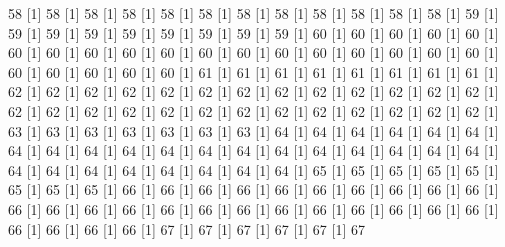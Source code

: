 \documentclass[12pt]{article}
\begin{document}
\begin{Schunk}
\begin{Soutput}
[1] 58%
[1] 58%
[1] 58%
[1] 58%
[1] 58%
[1] 58%
[1] 58%
[1] 58%
[1] 58%
[1] 58%
[1] 58%
[1] 58%
[1] 59%
[1] 59%
[1] 59%
[1] 59%
[1] 59%
[1] 59%
[1] 59%
[1] 59%
[1] 59%
[1] 60%
[1] 60%
[1] 60%
[1] 60%
[1] 60%
[1] 60%
[1] 60%
[1] 60%
[1] 60%
[1] 60%
[1] 60%
[1] 60%
[1] 60%
[1] 60%
[1] 60%
[1] 60%
[1] 60%
[1] 60%
[1] 60%
[1] 60%
[1] 60%
[1] 60%
[1] 60%
[1] 61%
[1] 61%
[1] 61%
[1] 61%
[1] 61%
[1] 61%
[1] 61%
[1] 61%
[1] 62%
[1] 62%
[1] 62%
[1] 62%
[1] 62%
[1] 62%
[1] 62%
[1] 62%
[1] 62%
[1] 62%
[1] 62%
[1] 62%
[1] 62%
[1] 62%
[1] 62%
[1] 62%
[1] 62%
[1] 62%
[1] 62%
[1] 62%
[1] 62%
[1] 62%
[1] 62%
[1] 62%
[1] 62%
[1] 62%
[1] 63%
[1] 63%
[1] 63%
[1] 63%
[1] 63%
[1] 63%
[1] 63%
[1] 64%
[1] 64%
[1] 64%
[1] 64%
[1] 64%
[1] 64%
[1] 64%
[1] 64%
[1] 64%
[1] 64%
[1] 64%
[1] 64%
[1] 64%
[1] 64%
[1] 64%
[1] 64%
[1] 64%
[1] 64%
[1] 64%
[1] 64%
[1] 64%
[1] 64%
[1] 64%
[1] 64%
[1] 64%
[1] 64%
[1] 64%
[1] 65%
[1] 65%
[1] 65%
[1] 65%
[1] 65%
[1] 65%
[1] 65%
[1] 65%
[1] 66%
[1] 66%
[1] 66%
[1] 66%
[1] 66%
[1] 66%
[1] 66%
[1] 66%
[1] 66%
[1] 66%
[1] 66%
[1] 66%
[1] 66%
[1] 66%
[1] 66%
[1] 66%
[1] 66%
[1] 66%
[1] 66%
[1] 66%
[1] 66%
[1] 66%
[1] 66%
[1] 66%
[1] 66%
[1] 66%
[1] 66%
[1] 67%
[1] 67%
[1] 67%
[1] 67%
[1] 67%
[1] 67%

\end{Soutput}
\end{Schunk}
\end{document}
